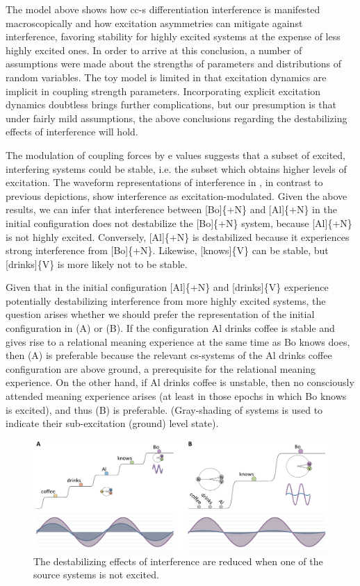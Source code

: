 The model above shows how cc-s differentiation interference is manifested macroscopically and how excitation asymmetries can mitigate against interference, favoring stability for highly excited systems at the expense of less highly excited ones. In order to arrive at this conclusion, a number of assumptions were made about the strengths of parameters and distributions of random variables. The toy model is limited in that excitation dynamics are implicit in coupling strength parameters. Incorporating explicit excitation dynamics doubtless brings further complications, but our presumption is that under fairly mild assumptions, the above conclusions regarding the destabilizing effects of interference will hold.

  The modulation of coupling forces by e values suggests that a subset of excited, interfering systems could be stable, i.e. the subset which obtains higher levels of excitation. The waveform representations of interference in {}, in contrast to previous depictions, show interference as excitation-modulated. Given the above results, we can infer that interference between [Bo]\{+N\} and [Al]\{+N\} in the initial configuration does not destabilize the [Bo]\{+N\} system, because [Al]\{+N\} is not highly excited. Conversely, [Al]\{+N\} is destabilized because it experiences strong interference from [Bo]\{+N\}. Likewise, [knows]\{V\} can be stable,  but [drinks]\{V\} is more likely not to be stable. 

  Given that in the initial configuration [Al]\{+N\} and [drinks]\{V\} experience potentially destabilizing interference from more highly excited systems, the question arises whether we should prefer the representation of the initial configuration in {}(A) or (B). If the configuration {\textbar}Al drinks coffee{\textbar} is stable and gives rise to a relational meaning experience at the same time as {\textbar}Bo knows{\textbar} does, then (A) is preferable because the relevant cs-systems of the {\textbar}Al drinks coffee{\textbar} configuration are above ground, a prerequisite for the relational meaning experience. On the other hand, if {\textbar}Al drinks coffee{\textbar} is unstable, then no consciously attended meaning experience arises (at least in those epochs in which {\textbar}Bo knows{\textbar} is excited), and thus (B) is preferable. (Gray-shading of systems is used to indicate their sub-excitation (ground) level state).

  
\begin{figure}
\includegraphics[width=\textwidth]{figures/Tilsen-img95.png}
\caption{The destabilizing effects of interference are reduced when one of the source systems is not excited.}
\label{fig:4:45}
\end{figure}

